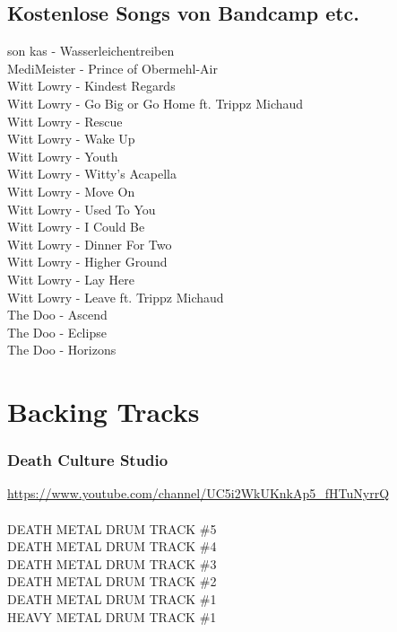 \section{Kostenlose Songs von Bandcamp etc.}

son kas - Wasserleichentreiben\\
MediMeister - Prince of Obermehl-Air\\
Witt Lowry - Kindest Regards\\
Witt Lowry - Go Big or Go Home ft. Trippz Michaud\\
Witt Lowry - Rescue\\
Witt Lowry - Wake Up\\
Witt Lowry - Youth\\
Witt Lowry - Witty's Acapella\\
Witt Lowry - Move On\\
Witt Lowry - Used To You\\
Witt Lowry - I Could Be\\
Witt Lowry - Dinner For Two\\
Witt Lowry - Higher Ground\\
Witt Lowry - Lay Here\\
Witt Lowry - Leave ft. Trippz Michaud\\
The Doo - Ascend\\
The Doo - Eclipse\\
The Doo - Horizons\\

\chapter{Backing Tracks}\label{btracks}

\subsection{Death Culture Studio}

\url*{https://www.youtube.com/channel/UC5i2WkUKnkAp5\_fHTuNyrrQ}\\
\ \\
DEATH METAL DRUM TRACK \#5\\
DEATH METAL DRUM TRACK \#4\\
DEATH METAL DRUM TRACK \#3\\
DEATH METAL DRUM TRACK \#2\\
DEATH METAL DRUM TRACK \#1\\
HEAVY METAL DRUM TRACK \#1\\

